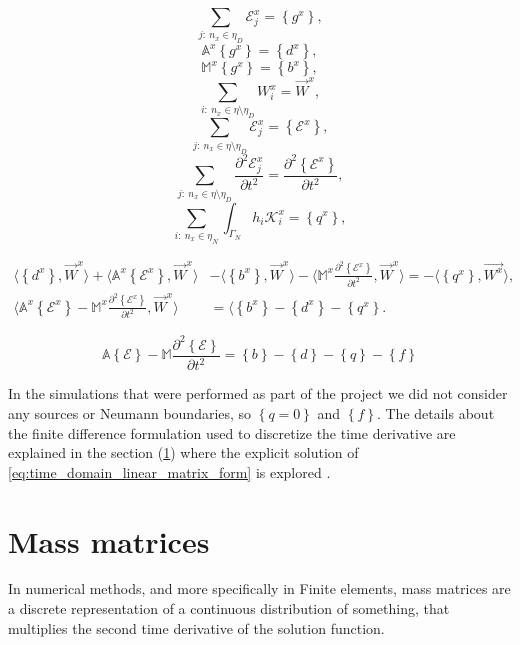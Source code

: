 $$\sum_{j:\ n_x \in \eta_D}\mathcal{E}_j^x = \left\lbrace g^x \right\rbrace, $$
$$ \mathbb{A}^x\left\lbrace g^x \right\rbrace=\left\lbrace d^x \right\rbrace,$$ 
$$\mathbb{M}^x\left\lbrace g^x \right\rbrace=\left\lbrace b^x \right\rbrace,$$
$$\sum_{i:\ n_x \in \eta\setminus\eta_D}W_i^x = \vec{W}^x, $$
$$\sum_{j:\ n_x \in\eta\setminus\eta_D}\mathcal{E}_j^x = \left\lbrace \mathcal{E}^x\right\rbrace, $$
$$\sum_{j:\ n_x \in\eta\setminus\eta_D}\frac{\partial^2 \mathcal{E}_j^x}{\partial t^2} = \frac{\partial^2\left\lbrace \mathcal{E}^x\right\rbrace}{\partial t^2}, $$
$$\sum_{i:\ n_x \in \eta_N}\int_{\Gamma_N} h_i\mathcal{K}_i^x = \left\lbrace q^x   \right\rbrace,$$

\begin{align}
\langle\left\lbrace d^x \right\rbrace,\vec{W}^x\rangle
+\langle\mathbb{A}^x\left\lbrace\mathcal{E}^x \right\rbrace,\vec{W}^x\rangle&-\langle \left\lbrace b^x \right\rbrace,\vec{W}^x\rangle
-\langle\mathbb{M}^x \frac{\partial^2\left\lbrace\mathcal{E}^x \right\rbrace}{\partial t^2},\vec{W}^x\rangle = -\langle \left\lbrace q^x\right\rbrace, \vec{W^x}\rangle \nonumber,\\
\langle\mathbb{A}^x\left\lbrace \mathcal{E}^x \right\rbrace- \mathbb{M}^x\frac{\partial^2\left\lbrace\mathcal{E}^x \right\rbrace}{\partial t^2},\vec{W}^x \rangle &=\langle \left\lbrace b^x \right\rbrace-\left\lbrace d^x \right\rbrace-\left\lbrace q^x   \right\rbrace.
\end{align}

\begin{equation}
\mathbb{A}\left\lbrace \mathcal{E} \right\rbrace- \mathbb{M}\frac{\partial^2\left\lbrace\mathcal{E} \right\rbrace}{\partial t^2} = \left\lbrace b \right\rbrace-\left\lbrace d \right\rbrace-\left\lbrace q   \right\rbrace-\left\lbrace f\right\rbrace
\label{eq:time_domain_linear_matrix_form}
\end{equation}

In the simulations that were performed as part of the project we did not consider any sources or Neumann boundaries, so $\left\lbrace q=0\right\rbrace$ and $\left\lbrace f\right\rbrace$. The details about the finite difference formulation used to discretize the time derivative are explained in the section (\ref{sec:explicit_formulation}) where the explicit solution of \ref{eq:time_domain_linear_matrix_form} is explored .


\section{Mass matrices}
\label{sec:explicit_formulation}
In numerical methods, and more specifically in Finite elements, mass matrices are a discrete representation of a continuous distribution of something, that multiplies the second time derivative of the solution function.

